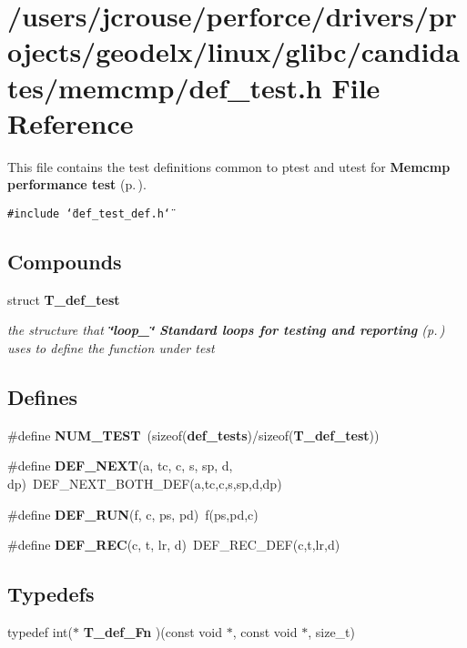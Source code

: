 \section{/users/jcrouse/perforce/drivers/projects/geodelx/linux/glibc/candidates/memcmp/def\_\-test.h File Reference}
\label{memcmp_2def__test_8h}
This file contains the test definitions common to ptest and utest for {\bf Memcmp performance test} {\rm (p.\,\pageref{group__memcmp__test})}. 


{\tt \#include \char`\"{}def\_\-test\_\-def.h\char`\"{}}\par
\subsection*{Compounds}
\begin{CompactItemize}
\item 
struct {\bf T\_\-def\_\-test}
\begin{CompactList}\small\item\em the structure that {\bf \char`\"{}loop\_\-\char`\"{} Standard loops for testing and reporting} {\rm (p.\,\pageref{group__loop__test})} uses to define the function under test\item\end{CompactList}\end{CompactItemize}
\subsection*{Defines}
\begin{CompactItemize}
\item 
\#define {\bf NUM\_\-TEST}\ (sizeof({\bf def\_\-tests})/sizeof({\bf T\_\-def\_\-test}))
\item 
\#define {\bf DEF\_\-NEXT}(a, tc, c, s, sp, d, dp)\ DEF\_\-NEXT\_\-BOTH\_\-DEF(a,tc,c,s,sp,d,dp)
\item 
\#define {\bf DEF\_\-RUN}(f, c, ps, pd)\ f(ps,pd,c)
\item 
\#define {\bf DEF\_\-REC}(c, t, lr, d)\ DEF\_\-REC\_\-DEF(c,t,lr,d)
\end{CompactItemize}
\subsection*{Typedefs}
\begin{CompactItemize}
\item 
typedef int($\ast$ {\bf T\_\-def\_\-Fn} )(const void $\ast$, const void $\ast$, size\_\-t)
\end{CompactItemize}
